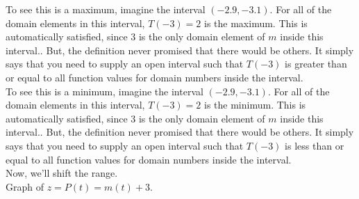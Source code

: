 \documentclass{ximera}
\begin{document}
\begin{example}
To see this is a maximum, imagine the interval $(-2.9, -3.1)$. For all of the domain elements in this interval, $T(-3)=2$ is the maximum.  This is automatically satisfied, since $3$ is the only domain element of $m$ inside this interval..  But, the definition never promised that there would be others.  It simply says that you need to supply an open interval such that $T(-3)$ is greater than or equal to all function values for domain numbers inside the interval. \\

To see this is a minimum, imagine the interval $(-2.9, -3.1)$. For all of the domain elements in this interval, $T(-3)=2$ is the minimum.  This is automatically satisfied, since $3$ is the only domain element of $m$ inside this interval..  But, the definition never promised that there would be others.  It simply says that you need to supply an open interval such that $T(-3)$ is less than or equal to all function values for domain numbers inside the interval. \\




Now, we'll shift the range. \\



Graph of $z = P(t) = m(t)+3$.

\begin{image}
\end{image}
\end{example}
\end{document}
